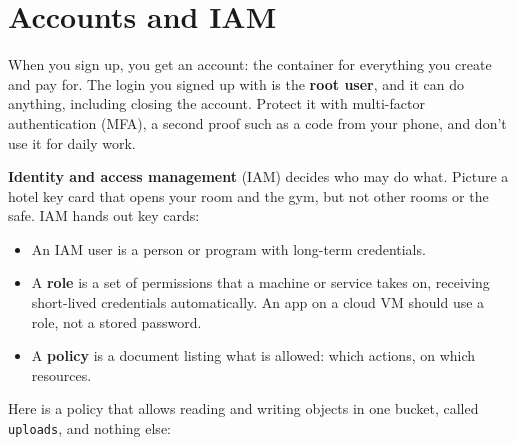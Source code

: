 \section{Accounts and IAM}\label{07-cloud-building-blocks:accounts-and-iam}

When you sign up, you get an account: the container for everything you create and pay for. The login you signed up with is the \textbf{root user}, and it can do anything, including closing the account. Protect it with multi-factor authentication (MFA), a second proof such as a code from your phone, and don't use it for daily work.

\textbf{Identity and access management} (IAM) decides who may do what. Picture a hotel key card that opens your room and the gym, but not other rooms or the safe. IAM hands out key cards:

\begin{itemize}
\tightlist
\item
  An IAM user is a person or program with long-term credentials.
\item
  A \textbf{role} is a set of permissions that a machine or service takes on, receiving short-lived credentials automatically. An app on a cloud VM should use a role, not a stored password.
\item
  A \textbf{policy} is a document listing what is allowed: which actions, on which resources.
\end{itemize}


Here is a policy that allows reading and writing objects in one bucket, called \texttt{uploads}, and nothing else:

\begin{codeblock}

\begin{Shaded}
\begin{Highlighting}[]
\FunctionTok{\{}
  \FunctionTok{:} \FunctionTok{,}
  \FunctionTok{:} \OtherTok{[}
    \FunctionTok{\{}
      \FunctionTok{:} \FunctionTok{,}
      \FunctionTok{:} \OtherTok{[}\OtherTok{,} \OtherTok{]}\FunctionTok{,}
      \FunctionTok{:} \OtherTok{[}\OtherTok{]}
    \FunctionTok{\}}
  \OtherTok{]}
\FunctionTok{\}}
\end{Highlighting}
\end{Shaded}

\end{codeblock}

